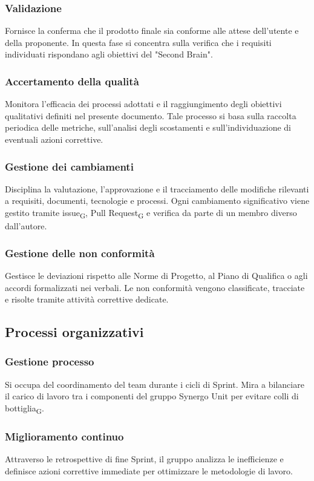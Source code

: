 \subsubsection{Validazione}
Fornisce la conferma che il prodotto finale sia conforme alle attese dell'utente e della proponente. In questa fase si concentra sulla verifica che i requisiti individuati rispondano agli obiettivi del "Second Brain".

\subsubsection{Accertamento della qualità}
Monitora l'efficacia dei processi adottati e il raggiungimento degli obiettivi qualitativi definiti nel presente documento. Tale processo si basa sulla raccolta periodica delle metriche, sull'analisi degli scostamenti e sull'individuazione di eventuali azioni correttive.

\subsubsection{Gestione dei cambiamenti}
Disciplina la valutazione, l'approvazione e il tracciamento delle modifiche rilevanti a requisiti, documenti, tecnologie e processi. Ogni cambiamento significativo viene gestito tramite issue\textsubscript{G}, Pull Request\textsubscript{G} e verifica da parte di un membro diverso dall'autore.

\subsubsection{Gestione delle non conformità}
Gestisce le deviazioni rispetto alle Norme di Progetto, al Piano di Qualifica o agli accordi formalizzati nei verbali. Le non conformità vengono classificate, tracciate e risolte tramite attività correttive dedicate.

\subsection{Processi organizzativi}
\subsubsection{Gestione processo}
Si occupa del coordinamento del team durante i cicli di Sprint. Mira a bilanciare il carico di lavoro tra i componenti del gruppo Synergo Unit per evitare colli di bottiglia\textsubscript{G}.

\subsubsection{Miglioramento continuo}
Attraverso le retrospettive di fine Sprint, il gruppo analizza le inefficienze e definisce azioni correttive immediate per ottimizzare le metodologie di lavoro.

